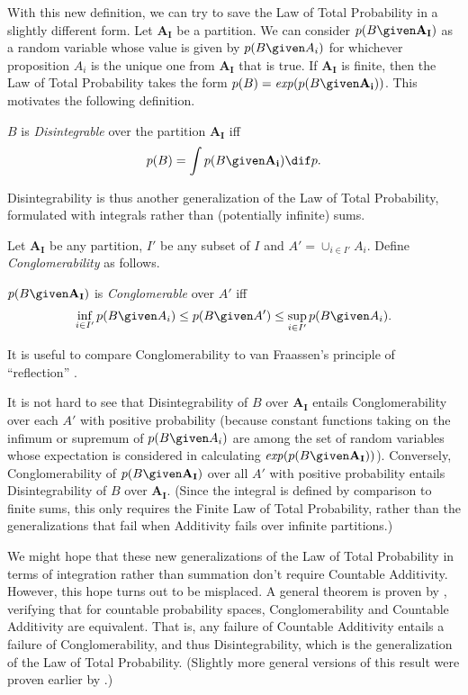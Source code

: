 With this new definition, we can try to save the Law of Total Probability in a slightly different form. Let $\mathbf{A_I}$ be a partition. We can consider $p(B \given \mathbf{A_I})$ as a random variable whose value is given by $p(B \given A_i)$ for whichever proposition $A_i$ is the unique one from $\mathbf{A_I}$ that is true. If $\mathbf{A_I}$ is finite, then the Law of Total Probability takes the form $p(B)=\text{\textit{exp}}(p(B \given \mathbf{A_i}))$. This motivates the following definition.
\begin{definition}\label{disintegrable}
$B$ is \emph{Disintegrable} over the partition $\mathbf{A_I}$ iff $$p(B)=\int p(B \given \mathbf{A_i}) \dif p.$$
\end{definition}
Disintegrability is thus another generalization of the Law of Total Probability, formulated with integrals rather than (potentially infinite) sums.

Let $\mathbf{A_I}$ be any partition, $I'$ be any subset of $I$ and $A'=\cup_{i\in I'}A_i$. Define \textit{Conglomerability} as follows.
\begin{definition}\label{conglomerable}
$p(B \given \mathbf{A_I})$ is \emph{Conglomerable} over $A'$ iff
$$\inf_{i\in I'} p(B \given A_i)\leq p(B \given A')\leq \sup_{i\in I'} p(B \given A_i).$$
\end{definition}
It is useful to compare Conglomerability to van Fraassen's principle of ``reflection'' \citep{belandwill, distrefl}.

It is not hard to see that Disintegrability of $B$ over $\mathbf{A_I}$ entails Conglomerability over each $A'$ with positive probability (because constant functions taking on the infimum or supremum of $p(B \given A_i)$ are among the set of random variables whose expectation is considered in calculating $\text{\textit{exp}}(p(B \given \mathbf{A_I}))$). Conversely, Conglomerability of $p(B \given \mathbf{A_I})$ over all $A'$ with positive probability entails Disintegrability of $B$ over $\mathbf{A_I}$. (Since the integral is defined by comparison to finite sums, this only requires the Finite Law of Total Probability, rather than the generalizations that fail when Additivity fails over infinite partitions.) 

We might hope that these new generalizations of the Law of Total Probability in terms of integration rather than summation don't require Countable Additivity. However, this hope turns out to be misplaced. A general theorem is proven by \citet{conglom}, verifying that for countable probability spaces, Conglomerability and Countable Additivity are equivalent. That is, any failure of Countable Additivity entails a failure of Conglomerability, and thus Disintegrability, which is the generalization of the Law of Total Probability. (Slightly more general versions of this result were proven earlier by \citealp{nonconglom}.)


